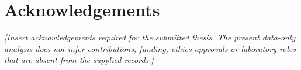 \chapter*{Acknowledgements}
\label{chap:acknowledgements}

\emph{[Insert acknowledgements required for the submitted thesis. The present data-only analysis does not infer contributions, funding, ethics approvals or laboratory roles that are absent from the supplied records.]}
